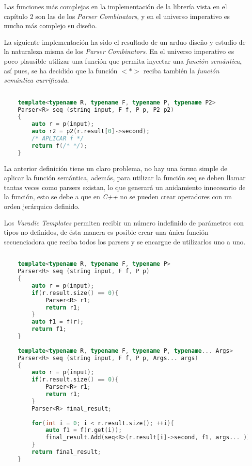 	Las funciones más complejas en la implementación de la librería vista en el capítulo 2 son las de los \emph{Parser Combinators}, y en el universo imperativo es mucho más complejo su diseño.
	
	La siguiente implementación ha sido el resultado de un arduo diseño y estudio de la naturaleza misma de los \emph{Parser Combinators}. En el universo imperativo es poco plausible utilizar una función que permita inyectar una \emph{función semántica}, así pues, se ha decidido que la función $<*>$ reciba también la \emph{función semántica currificada}.
	
	\begin{lstlisting}[language=C++, caption=función secuenciadora en C++]
	
	template<typename R, typename F, typename P, typename P2>
	Parser<R> seq (string input, F f, P p, P2 p2)
	{
		auto r = p(input);
		auto r2 = p2(r.result[0]->second);
		/* APLICAR f */
		return f(/* */);
	}	
	\end{lstlisting}
	
	La anterior definición tiene un claro problema, no hay una forma simple de aplicar la función semántica, además, para utilizar la función seq se deben llamar tantas veces como parsers existan, lo que generará un anidamiento innecesario de la función, esto se debe a que en \emph{C++} no se pueden crear operadores con un orden jerárquico definido.
	
	Los \emph{Varadic Templates} permiten recibir un número indefinido de parámetros con tipos no definidos, de ésta manera es posible crear una única función secuenciadora que reciba todos los parsers y se encargue de utilizarlos uno a uno.
	
	\begin{lstlisting}[language=C++, caption=función secuenciadora en C++]
	
	template<typename R, typename F, typename P>
	Parser<R> seq (string input, F f, P p)
	{
		auto r = p(input);
		if(r.result.size() == 0){
			Parser<R> r1;
			return r1;
		}		
		auto f1 = f(r);
		return f1;
	}
	
	template<typename R, typename F, typename P, typename... Args>
	Parser<R> seq (string input, F f, P p, Args... args)
	{
		auto r = p(input);
		if(r.result.size() == 0){
			Parser<R> r1;
			return r1;
		}
		Parser<R> final_result;
		
		for(int i = 0; i < r.result.size(); ++i){		
			auto f1 = f(r.get(i));
			final_result.Add(seq<R>(r.result[i]->second, f1, args... ));
		}		
		return final_result;
	}	
	\end{lstlisting}
	
